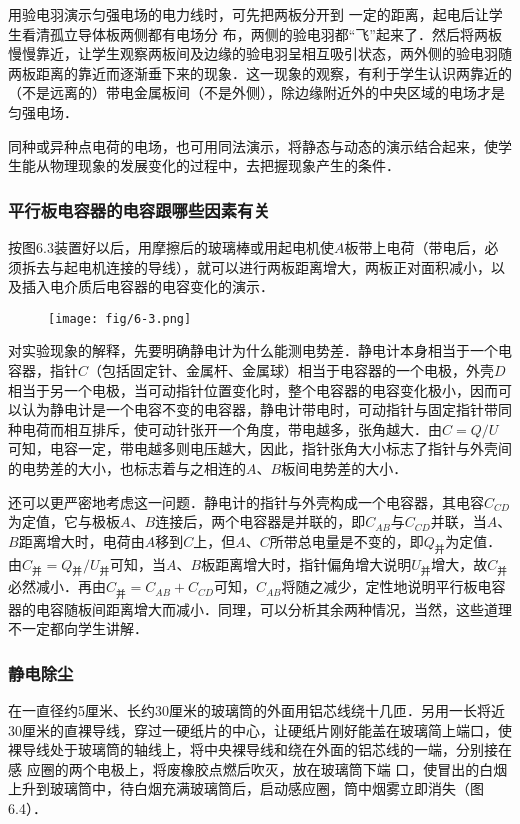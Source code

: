 用验电羽演示匀强电场的电力线时，可先把两板分开到
一定的距离，起电后让学生看清孤立导体板两侧都有电场分
布，两侧的验电羽都“飞”起来了．然后将两板慢慢靠近，让学生观察两板间及边缘的验电羽呈相互吸引状态，两外侧的验电羽随两板距离的靠近而逐渐垂下来的现象．这一现象的观察，有利于学生认识两靠近的（不是远离的）带电金属板间（不是外侧），除边缘附近外的中央区域的电场才是匀强电场．

同种或异种点电荷的电场，也可用同法演示，将静态与动态的演示结合起来，使学生能从物理现象的发展变化的过程中，去把握现象产生的条件．

\subsubsection{平行板电容器的电容跟哪些因素有关}
按图6.3装置好以后，用摩擦后的玻璃棒或用起电机使$A$板带上电荷（带电后，必须拆去与起电机连接的导线），就可以进行两板距离增大，两板正对面积减小，以及插入电介质后电容器的电容变化的演示．
\begin{figure}[htp]
    \centering
   \texttt{[image: fig/6-3.png]}
    \caption{}
\end{figure}

对实验现象的解释，先要明确静电计为什么能测电势差．静电计本身相当于一个电容器，指针$C$（包括固定针、金属杆、金属球）相当于电容器的一个电极，外壳$D$相当于另一个电极，当可动指针位置变化时，整个电容器的电容变化极小，因而可
以认为静电计是一个电容不变的电容器，静电计带电时，可动指针与固定指针带同种电荷而相互排斥，使可动针张开一个角度，带电越多，张角越大．由$C=Q/U$可知，电容一定，带电越多则电压越大，因此，指针张角大小标志了指针与外壳间的电势差的大小，也标志着与之相连的$A$、$B$板间电势差的大小．

还可以更严密地考虑这一问题．静电计的指针与外壳构成一个电容器，其电容$C_{CD}$为定值，它与极板$A$、$B$连接后，两个电容器是并联的，即$C_{AB}$与$C_{CD}$并联，当$A$、$B$距离增大时，电荷由$A$移到$C$上，但$A$、$C$所带总电量是不变的，即$Q_{\text{并}}$为定值．由$C_{\text{并}}=Q_{\text{并}}/U_{\text{并}}$可知，当$A$、$B$板距离增大时，指针偏角增大说明$U_{\text{并}}$增大，故$C_{\text{并}}$必然减小．再由$C_{\text{并}}=C_{AB}+C_{CD}$可知，$C_{AB}$将随之减少，定性地说明平行板电容器的电容随板间距离增大而减小．同理，可以分析其余两种情况，当然，这些道理不一定都向学生讲解．

\subsubsection{静电除尘}

在一直径约5厘米、长约30厘米的玻璃筒的外面用铝芯线绕十几匝．另用一长将近30厘米的直裸导线，穿过一硬纸片的中心，让硬纸片刚好能盖在玻璃简上端口，使裸导线处于玻璃筒的轴线上，将中央裸导线和绕在外面的铝芯线的一端，分别接在感
应圈的两个电极上，将废橡胶点燃后吹灭，放在玻璃筒下端
口，使冒出的白烟上升到玻璃筒中，待白烟充满玻璃筒后，启动感应圈，筒中烟雾立即消失（图6.4）．

